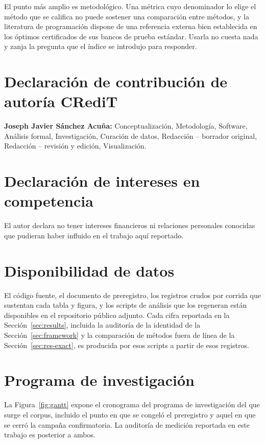 \documentclass[a4paper,fleqn]{cas-sc}
\begin{document}
El punto más amplio es metodológico. Una métrica cuyo denominador lo elige el
método que se califica no puede sostener una comparación entre métodos, y la
literatura de programación dispone de una referencia externa bien establecida en
los óptimos certificados de sus bancos de prueba estándar. Usarla no cuesta nada
y zanja la pregunta que el índice se introdujo para responder.

\section*{Declaración de contribución de autoría CRediT}

\textbf{Joseph Javier Sánchez Acuña:} Conceptualización, Metodología, Software,
Análisis formal, Investigación, Curación de datos, Redacción -- borrador
original, Redacción -- revisión y edición, Visualización.

\section*{Declaración de intereses en competencia}

El autor declara no tener intereses financieros ni relaciones personales
conocidas que pudieran haber influido en el trabajo aquí reportado.

\section*{Disponibilidad de datos}

El código fuente, el documento de preregistro, los registros crudos por corrida
que sustentan cada tabla y figura, y los scripts de análisis que los regeneran
están disponibles en el repositorio público adjunto. Cada cifra reportada en la
Sección~\ref{sec:results}, incluida la auditoría de la identidad de la
Sección~\ref{sec:framework} y la comparación de métodos fuera de línea de la
Sección~\ref{sec:res-exact}, es producida por esos scripts a partir de esos
registros.

\appendix

\section{Programa de investigación}\label{app:gantt}

La Figura~\ref{fig:gantt} expone el cronograma del programa de investigación del
que surge el corpus, incluido el punto en que se congeló el preregistro y aquel
en que se cerró la campaña confirmatoria. La auditoría de medición reportada en
este trabajo es posterior a ambos.
\end{document}
